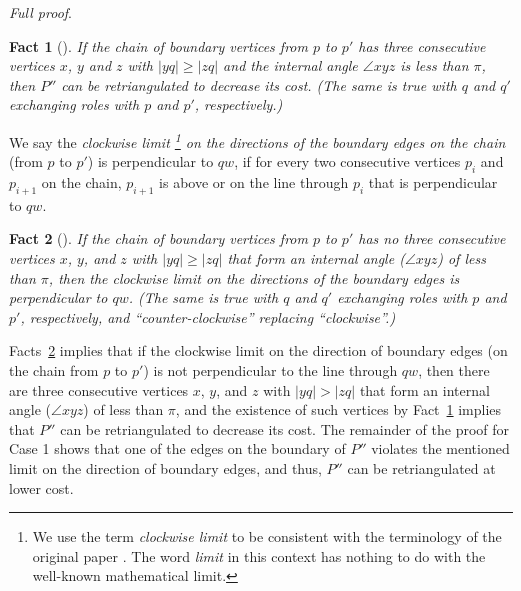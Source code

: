 \documentclass[final]{siamltex}
\newtheorem{fact}{Fact}[theorem]
\newenvironment{fullproof}{\par{\it Full proof}. \ignorespaces}{\endproof}
\begin{document}
\begin{fullproof}
\begin{fact}[{\cite[Lemma 7]{drysdale2001exclusion}}]\label{lemma:diamond7}
If the chain of boundary vertices from $p$ to $p'$ 
has three consecutive vertices $x$, $y$ and $z$ with $|y q|\ge|z q|$ 
and the internal angle $\angle x y z$ is less than $\pi$, then $P''$ can be retriangulated 
to decrease its cost. 
(The same is true with $q$ and $q'$ exchanging roles with $p$ and $p'$, respectively.)
\end{fact}

We say the {\em clockwise limit \footnote{ We use the term {\em clockwise limit} to be consistent with the 
terminology of the original paper \cite{drysdale2001exclusion}. The word {\em limit} in this context has nothing 
to do with the well-known mathematical limit.} on the directions of the boundary edges on the chain} (from $p$ to $p'$)
is perpendicular to $q w$, if for every two consecutive vertices $p_i$ and $p_{i+1}$ on the chain,
$p_{i+1}$ is above or on the line through $p_i$ that is perpendicular to $q w$.

\begin{fact}[{\cite[Lemma 6]{drysdale2001exclusion}}]\label{lemma:diamond6}
If the chain of boundary vertices from $p$ to $p'$ 
has no 
three consecutive vertices $x$, $y$, and $z$ with $|y q|\ge|z q|$ 
that form an internal angle ($\angle{x y z}$) of less than $\pi$, 
then the clockwise limit on the directions
of the boundary edges is perpendicular to $q w$. 
(The same is true with $q$ and $q'$ exchanging roles with $p$ and $p'$, respectively,
and ``counter-clockwise'' replacing ``clockwise''.)
\end{fact}



Facts~\ref{lemma:diamond6} implies that if the clockwise limit on the direction 
of boundary edges (on the chain from $p$ to $p'$) is not perpendicular to the line through $q w$, then
there are three consecutive vertices $x$, $y$, and $z$ with $|y q|>|z q|$ 
that form an internal angle ($\angle{x y z}$) of less than $\pi$, and the existence of 
such vertices by Fact~\ref{lemma:diamond7} implies that $P''$ can be retriangulated 
to decrease its cost. The remainder of the proof for Case 1 shows that one of the edges 
on the boundary of $P''$ violates the mentioned
limit on the direction of boundary edges, and thus, $P''$ can be retriangulated at lower cost.




\end{fullproof}
\end{document}
